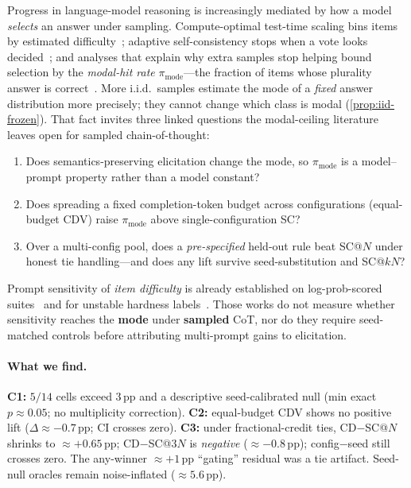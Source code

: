 \documentclass{article}
\newcommand{\pmode}{\pi_{\mathrm{mode}}}
\theoremstyle{plain}
\theoremstyle{definition}
\theoremstyle{remark}
\begin{document}
Progress in language-model reasoning is increasingly mediated by how a model
\emph{selects} an answer under sampling. Compute-optimal test-time scaling bins
items by estimated difficulty~\citep{snell2024scaling}; adaptive
self-consistency stops when a vote looks decided~\citep{aggarwal2023adaptive,li2024esc};
and analyses that explain why extra samples stop helping bound selection by the
\emph{modal-hit rate} $\pmode$---the fraction of items whose plurality answer is
correct~\citep{brown2024monkeys,blendasc2025,certifiedsc2025,bay2026modal}.
More i.i.d.\ samples estimate the mode of a \emph{fixed} answer distribution more
precisely; they cannot change which class is modal
(\cref{prop:iid-frozen}). That fact invites three linked questions the
modal-ceiling literature leaves open for sampled chain-of-thought:

\begin{enumerate}\itemsep1pt
  \item[\textbf{C1.}] Does semantics-preserving elicitation change the mode, so
    $\pmode$ is a model--prompt property rather than a model constant?
  \item[\textbf{C2.}] Does spreading a fixed completion-token budget across
    configurations (equal-budget CDV) raise $\pmode$ above single-configuration
    SC?
  \item[\textbf{C3.}] Over a multi-config pool, does a \emph{pre-specified}
    held-out rule beat SC@$N$ under honest tie handling---and does any lift
    survive seed-substitution and SC@$kN$?
\end{enumerate}

Prompt sensitivity of \emph{item difficulty} is already established on
log-prob-scored suites~\citep{brittlebench2026,tee2026} and for unstable hardness
labels~\citep{hardunreached2026}. Those works do not measure whether sensitivity
reaches the \textbf{mode} under \textbf{sampled} CoT, nor do they require
seed-matched controls before attributing multi-prompt gains to elicitation.

\paragraph{What we find.}
\textbf{C1:} $5/14$ cells exceed $3$\,pp and a descriptive seed-calibrated
null (min exact $p{\approx}0.05$; no multiplicity correction).
\textbf{C2:} equal-budget CDV shows no positive lift
($\Delta{\approx}{-}0.7$\,pp; CI crosses zero).
\textbf{C3:} under fractional-credit ties, CD$-$SC@$N$ shrinks to
${\approx}{+}0.65$\,pp; CD$-$SC@$3N$ is \emph{negative}
(${\approx}{-}0.8$\,pp); config$-$seed still crosses zero. The any-winner
${\approx}{+}1$\,pp ``gating'' residual was a tie artifact. Seed-null
oracles remain noise-inflated (${\approx}5.6$\,pp).
\end{document}
